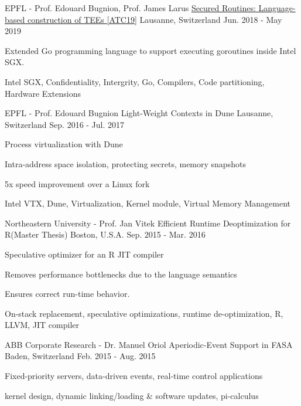 \begin{cventries}
\cventry
{EPFL - Prof. Edouard Bugnion, Prof. James Larus}
  {\href{https://www.usenix.org/system/files/atc19-ghosn_0.pdf}{Secured Routines: Language-based construction of TEEs [ATC19]}}
{Lausanne, Switzerland}
{Jun. 2018  - May 2019}
{
	\begin{cvitems}
  \item{Extended Go programming language to  support executing goroutines inside Intel SGX.}
	\item{Intel SGX, Confidentiality, Intergrity, Go, Compilers, Code partitioning, Hardware Extensions}
	\end{cvitems}
}

\cventry
{EPFL - Prof. Edouard Bugnion}
{Light-Weight Contexts in Dune}
{Lausanne, Switzerland}
{Sep. 2016 - Jul. 2017}
{
	\begin{cvitems}
  \item{Process virtualization with Dune}
  \item{Intra-address space isolation, protecting secrets, memory snapshots}
  \item{5x speed improvement over a Linux fork}
	\item{Intel VTX, Dune, Virtualization, Kernel module, Virtual Memory Management}
	\end{cvitems}
}

\cventry
{Northeastern University - Prof. Jan Vitek} %
{Efficient Runtime Deoptimization for R(Master Thesis)} %
{Boston, U.S.A.} %
{Sep. 2015 - Mar. 2016} %
{ %
\begin{cvitems}
\item{Speculative optimizer for an R JIT compiler}
\item{Removes performance bottlenecks due to the language semantics}
\item{Ensures correct run-time behavior.}
\item {On-stack replacement, speculative optimizations, runtime de-optimization, R, LLVM, JIT compiler}
\end{cvitems}
}

\cventry
{ABB Corporate Research - Dr. Manuel Oriol}
{Aperiodic-Event Support in FASA}
{Baden, Switzerland}
{Feb. 2015 - Aug. 2015}
{
	\begin{cvitems}
  \item{Fixed-priority servers, data-driven events, real-time control applications}
  \item{kernel design, dynamic linking/loading \& software updates, pi-calculus}
	\end{cvitems}
}


\end{cventries}
